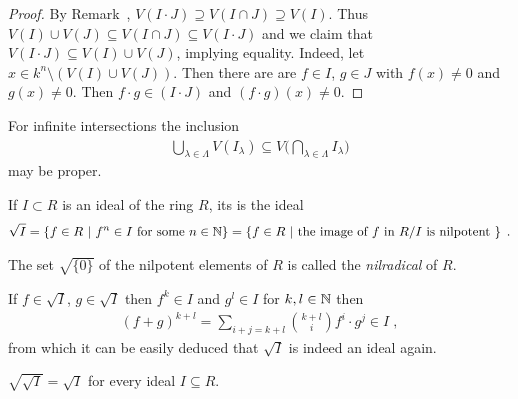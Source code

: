\documentclass[a4paper,parskip=half,numbers=enddot, DIV=12]{scrreprt}
\begin{document}
	\begin{proof}
		By Remark~, $V(I\cdot J) \supseteq V(I\cap J) \supseteq V(I)$. Thus $V(I)\cup V(J) \subseteq V(I\cap J) \subseteq V(I\cdot J)$ and we claim that $V(I\cdot J)\subseteq V(I)\cup V(J)$, implying equality. Indeed, let $x\in k^n\setminus (V(I)\cup V(J))$. Then there are are $f\in I$, $g\in J$ with $f(x)\neq 0$ and $g(x)\neq 0$. Then $f\cdot g\in (I\cdot J)$ and $(f\cdot g)(x) \neq 0$.
	\end{proof}
	\begin{rem}
		For infinite intersections the inclusion 
		\begin{align*}
		\bigcup_{\lambda\in \Lambda} V(I_\lambda) \subseteq V\bigg(\bigcap_{\lambda\in\Lambda} I_\lambda\bigg) 
		\end{align*}
		may be proper.
		
	\end{rem}
	
	\begin{defi}
		If $I\subset R$ is an ideal of the ring $R$, its  is the ideal
		\begin{align*}
		\sqrt{I} = \left\{f\in R\ \middle|\  f^n\in I \text{ for some }n\in \mathbb{N}\right\} = \left\{f\in R\ \middle|\  \text{the image of } f\text{ in } R/I \text{ is nilpotent }\right\}\;.
		\end{align*}
	\end{defi}
	
	\begin{rem*}
		\begin{alphanumerate}
			\item The set $\sqrt{\{0\}}$ of the nilpotent elements of $R$ is called the \emph{nilradical} of $R$.
			\item If $f\in \sqrt{I}$, $g\in\sqrt{I}$ then $f^k\in I$ and $g^l\in I$ for $k,l\in \mathbb{N}$ then
			\begin{align*}
			(f+g)^{k+l} =\sum_{i+j=k+l} \binom{k+l}{i} f^i\cdot g^{j}\in I\;,
			\end{align*}
			from which it can be easily deduced that $\sqrt I$ is indeed an ideal again.
			\item $\sqrt{\sqrt{I}}  = \sqrt{I}$ for every ideal $I\subseteq R$.
		\end{alphanumerate}
	\end{rem*}
	
\end{document}
